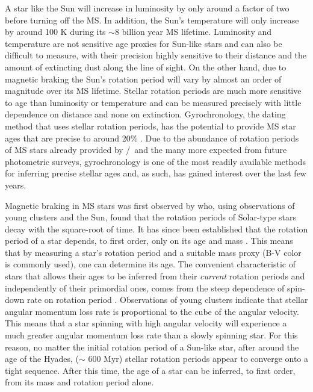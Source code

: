 A star like the Sun will increase in luminosity by only around a factor of two
before turning off the MS.
In addition, the Sun's temperature will only increase by around 100 K during
its $\sim$8 billion year MS lifetime.
Luminosity and temperature are not sensitive age proxies for Sun-like stars
and can also be difficult to measure, with their precision highly sensitive to
their distance and the amount of extincting dust along the line of sight.
On the other hand, due to magnetic braking the Sun's rotation period will vary
by almost an order of magnitude over its MS lifetime.
Stellar rotation periods are much more sensitive to age than luminosity or
temperature and can be measured precisely with little dependence on distance
and none on extinction.
Gyrochronology, the dating method that uses stellar rotation periods, has the
potential to provide MS star ages that are precise to around 20\%
\citep{epstein2014}.
Due to the abundance of rotation periods of MS stars already provided by
\kepler/\ktwo\ and the many more expected from future photometric surveys,
gyrochronology is one of the most readily available methods for inferring
precise stellar ages and, as such, has gained interest over the last few
years.

Magnetic braking in MS stars was first observed by \citet{Skumanich1972} who,
using observations of young clusters and the Sun, found that the rotation
periods of Solar-type stars decay with the square-root of time.
It has since been established that the rotation period of a star depends, to
first order, only on its age and mass \citep[\eg][]{barnes2003}.
This means that by measuring a star's rotation period and a suitable mass
proxy (B-V color is commonly used), one can determine its age.
The convenient characteristic of stars that allows their ages to be inferred
from their {\it current} rotation periods and independently of their
primordial ones, comes from the steep dependence of spin-down rate on rotation
period \citep{kawaler1989}.
Observations of young clusters indicate that stellar angular momentum loss
rate is proportional to the cube of the angular velocity.
This means that a star spinning with high angular velocity will experience a
much greater angular momentum loss rate than a slowly spinning star.
For this reason, no matter the initial rotation period of a Sun-like star,
after around the age of the Hyades, ($\sim$ 600 Myr) stellar rotation periods
appear to converge onto a tight sequence.
After this time, the age of a star can be inferred, to first order, from its
mass and rotation period alone.

